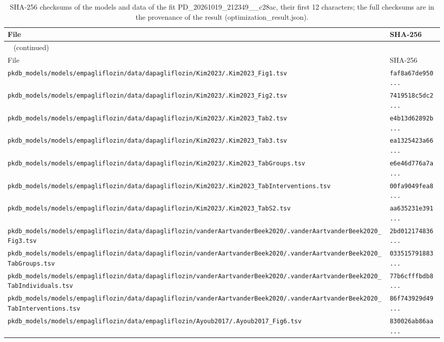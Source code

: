 \begin{longtable}{ll}
\caption{SHA-256 checksums of the models and data of the fit PD\_20261019\_212349\_\_c28ac, their first 12 characters; the full checksums are in the provenance of the result (optimization\_result.json).}\label{tab:checksums:PD_20261019_212349__c28ac} \\
\toprule
File & SHA-256 \\
\midrule
\endfirsthead
\multicolumn{2}{l}{\small\tablename~\thetable{} (continued)} \\
\toprule
File & SHA-256 \\
\midrule
\endhead
\bottomrule
\endlastfoot
\texttt{pkdb\_models/models/empagliflozin/data/dapagliflozin/Kim2023/.Kim2023\_Fig1.tsv} & \texttt{faf8a67de950...} \\
\texttt{pkdb\_models/models/empagliflozin/data/dapagliflozin/Kim2023/.Kim2023\_Fig2.tsv} & \texttt{7419518c5dc2...} \\
\texttt{pkdb\_models/models/empagliflozin/data/dapagliflozin/Kim2023/.Kim2023\_Tab2.tsv} & \texttt{e4b13d62892b...} \\
\texttt{pkdb\_models/models/empagliflozin/data/dapagliflozin/Kim2023/.Kim2023\_Tab3.tsv} & \texttt{ea1325423a66...} \\
\texttt{pkdb\_models/models/empagliflozin/data/dapagliflozin/Kim2023/.Kim2023\_TabGroups.tsv} & \texttt{e6e46d776a7a...} \\
\texttt{pkdb\_models/models/empagliflozin/data/dapagliflozin/Kim2023/.Kim2023\_TabInterventions.tsv} & \texttt{00fa9049fea8...} \\
\texttt{pkdb\_models/models/empagliflozin/data/dapagliflozin/Kim2023/.Kim2023\_TabS2.tsv} & \texttt{aa635231e391...} \\
\texttt{pkdb\_models/models/empagliflozin/data/dapagliflozin/vanderAartvanderBeek2020/.vanderAartvanderBeek2020\_Fig3.tsv} & \texttt{2bd012174836...} \\
\texttt{pkdb\_models/models/empagliflozin/data/dapagliflozin/vanderAartvanderBeek2020/.vanderAartvanderBeek2020\_TabGroups.tsv} & \texttt{033515791883...} \\
\texttt{pkdb\_models/models/empagliflozin/data/dapagliflozin/vanderAartvanderBeek2020/.vanderAartvanderBeek2020\_TabIndividuals.tsv} & \texttt{77b6cfffbdb8...} \\
\texttt{pkdb\_models/models/empagliflozin/data/dapagliflozin/vanderAartvanderBeek2020/.vanderAartvanderBeek2020\_TabInterventions.tsv} & \texttt{86f743929d49...} \\
\texttt{pkdb\_models/models/empagliflozin/data/empagliflozin/Ayoub2017/.Ayoub2017\_Fig6.tsv} & \texttt{830026ab86aa...} \\

\end{longtable}
